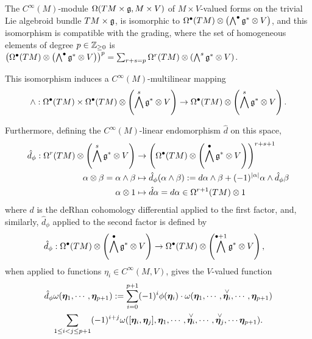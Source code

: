 \begin{theorem}\label{theoremTrivialFormsEValuedLValuedIsDifferentialModuleDefinitions}
The $C^\infty(M)$-module $\Omega(TM \times \mathfrak{g}, M \times V)$ of $M \times V$-valued forms on the trivial Lie algebroid bundle $TM \times \mathfrak{g}$, is isomorphic to $\Omega^\bullet(TM) \otimes \left(\bigwedge^\bullet \mathfrak{g}^* \otimes V\right)$, and this isomorphism is compatible with the grading, where the set of homogeneous elements of degree $p \in \mathbb{Z}_{\geq 0}$ is $\left( \Omega^\bullet(TM) \otimes \left(\bigwedge^\bullet \mathfrak{g}^* \otimes V\right) \right)^p = \sum_{r + s = p} \Omega^r(TM) \otimes \left(\bigwedge^s \mathfrak{g}^* \otimes V\right)$. 

This isomorphism induces a $C^\infty(M)$-multilinear mapping
\begin{equation}
    \wedge: \Omega^\bullet(TM) \times \Omega^\bullet(TM) \otimes \left(\bigwedge^s \mathfrak{g}^* \otimes V\right)
    \to 
    \Omega^\bullet(TM) \otimes \left(\bigwedge^s \mathfrak{g}^* \otimes V\right).
\end{equation}

Furthermore, defining the $C^\infty(M)$-linear endomorphism $\hat d$ on this space, 
\begin{align}
    \hat d_\phi: \Omega^r(TM) \otimes \left(\bigwedge^s \alg g^* \otimes V\right) &\to \left( \Omega^\bullet(TM) \otimes \left(\bigwedge^\bullet \alg g^* \otimes V\right)\right)^{r+s+1} \\
    \alpha \otimes \beta = \alpha \wedge \beta &\mapsto  \hat d_\phi (\alpha \wedge \beta) := d\alpha \wedge \beta + (-1)^{|\alpha|} \alpha \wedge \hat d_{\phi} \beta \\
    \alpha \otimes 1 &\mapsto \hat d\alpha = d\alpha \in \Omega^{r+1}(TM) \otimes 1 
\end{align}
where $d$ is the deRhan cohomology differential applied to the first factor, and, similarly, $\hat d_\phi$ applied to the second factor is defined by
\begin{align*}
    \hat d_\phi: \Omega^\bullet(TM) \otimes \left(\bigwedge^\bullet \alg g^* \otimes V\right) &\to \Omega^\bullet(TM) \otimes \left(\bigwedge^{\bullet+1} \alg g^* \otimes V\right),
\end{align*} when applied to functions $\eta_i \in C^\infty(M, V)$, gives the $V$-valued function
\begin{multline}
    \hat d_\phi\omega(\sect \eta_1, \cdots, \sect \eta_{p+1}) := \sum_{i = 0}^{p+1} (-1)^i \phi(\sect \eta_i) \cdot \omega(\sect \eta_1, \cdots, \overset{\vee}{\sect \eta_i}, \cdots, \sect \eta_{p+1}) \\
    \sum_{1 \leq i < j \leq p+1} (-1)^{i+j} \omega([\sect \eta_i, \sect \eta_j], \sect \eta_1, \cdots, \overset{\vee}{\sect \eta_i}, \cdots, \overset{\vee}{\sect \eta_j}, \cdots \sect \eta_{p+1}).
\end{multline}


\end{theorem}

